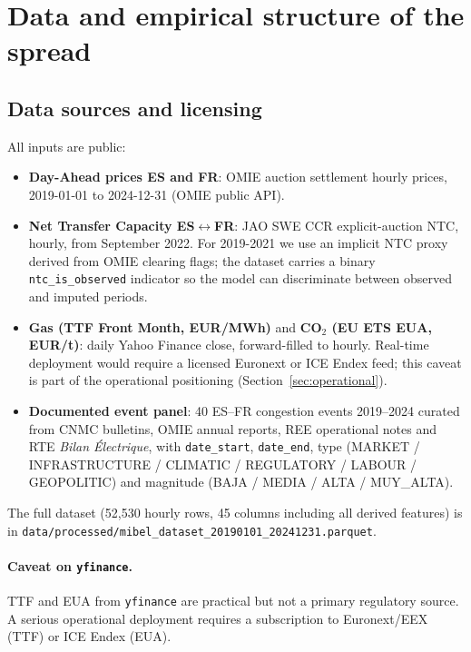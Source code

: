 \documentclass[11pt,a4paper]{article}
\begin{document}
\section{Data and empirical structure of the spread}\label{sec:data}

\subsection{Data sources and licensing}

All inputs are public:

\begin{itemize}
\item \textbf{Day-Ahead prices ES and FR}: OMIE auction settlement
hourly prices, 2019-01-01 to 2024-12-31 (OMIE public API).
\item \textbf{Net Transfer Capacity ES$\leftrightarrow$FR}:
JAO SWE CCR explicit-auction NTC, hourly, from September 2022.
For 2019-2021 we use an implicit NTC proxy derived from OMIE
clearing flags; the dataset carries a binary
\texttt{ntc\_is\_observed} indicator so the model can discriminate
between observed and imputed periods.
\item \textbf{Gas (TTF Front Month, EUR/MWh)} and
\textbf{CO$_2$ (EU ETS EUA, EUR/t)}: daily Yahoo Finance close,
forward-filled to hourly. Real-time deployment would require a
licensed Euronext or ICE Endex feed; this caveat is part of the
operational positioning (Section~\ref{sec:operational}).
\item \textbf{Documented event panel}: 40 ES--FR congestion events
2019--2024 curated from CNMC bulletins, OMIE annual reports, REE
operational notes and RTE \emph{Bilan Électrique}, with
\texttt{date\_start}, \texttt{date\_end}, type
(MARKET / INFRASTRUCTURE / CLIMATIC / REGULATORY / LABOUR /
GEOPOLITIC) and magnitude (BAJA / MEDIA / ALTA / MUY\_ALTA).
\end{itemize}

The full dataset (52,530 hourly rows, 45 columns including all
derived features) is in
\texttt{data/processed/mibel\_dataset\_20190101\_20241231.parquet}.

\paragraph{Caveat on \texttt{yfinance}.} TTF and EUA from
\texttt{yfinance} are practical but not a primary regulatory source.
A serious operational deployment requires a subscription to
Euronext/EEX (TTF) or ICE Endex (EUA).
\end{document}
